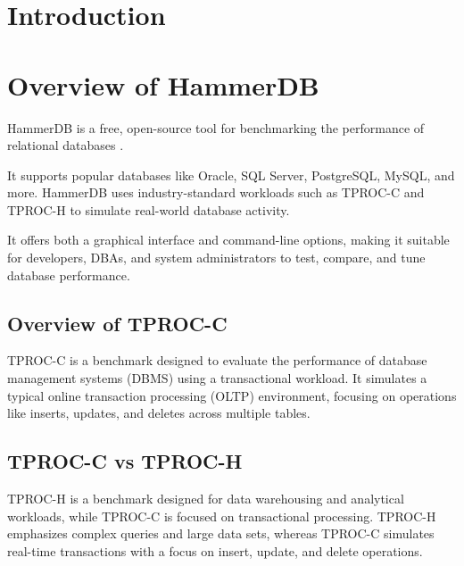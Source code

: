 
\section{Introduction}
\label{sec:intro}

\section{Overview of HammerDB}
\label{sec:hammerdb}

HammerDB is a free, open-source tool for benchmarking the performance of relational databases \cite{enwiki:1275860580}.

It supports popular databases like Oracle, SQL Server, PostgreSQL, MySQL, and more. HammerDB uses industry-standard workloads such as TPROC-C and TPROC-H to simulate real-world database activity.

It offers both a graphical interface and command-line options, making it suitable for developers, DBAs, and system administrators to test, compare, and tune database performance.

\subsection{Overview of TPROC-C}
\label{sec:tproc-c}

TPROC-C is a benchmark designed to evaluate the performance of database management systems (DBMS) using a transactional workload. It simulates a typical online transaction processing (OLTP) environment, focusing on operations like inserts, updates, and deletes across multiple tables.

\subsection{TPROC-C vs TPROC-H}
\label{sec:tproc-c-vs-tproc-h}

TPROC-H is a benchmark designed for data warehousing and analytical workloads, while TPROC-C is focused on transactional processing. TPROC-H emphasizes complex queries and large data sets, whereas TPROC-C simulates real-time transactions with a focus on insert, update, and delete operations.

